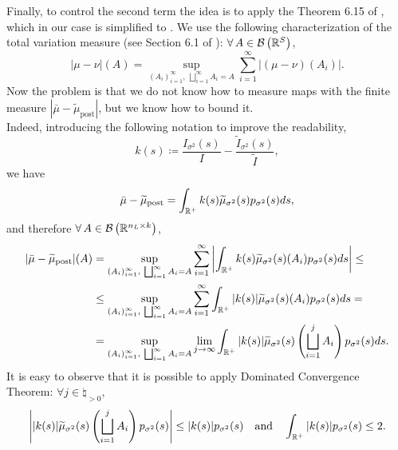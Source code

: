 Finally, to control the second term the idea is to apply the Theorem 6.15 of \citet{otvillani2008}, which in our case is simplified to . 
We use the following characterization of the total variation measure (see Section 6.1 of \citet{rcarudin1987}): $\forall A \in \borel{\real^S}$,
\begin{equation*}
	|\mu - \nu|(A) = \sup_{\left(A_i\right)_{i = 1}^{\infty}, \ \bigsqcup_{i = 1}^{\infty} A_i = A} \sum_{i = 1}^{\infty} |(\mu - \nu)(A_i)|.
\end{equation*}
Now the problem is that we do not know how to measure maps with the finite measure $|\bar{\mu} - \widetilde{\mu}_\mathrm{post}|$, but we know how to bound it. \\
Indeed, introducing the following notation to improve the readability,
\begin{equation*}
	k(s) \coloneqq \frac{\mathit{I}_{\sigma^2}(s)}{\mathit{I}} - \frac{\widetilde{\mathit{I}}_{\sigma^2}(s)}{\widetilde{\mathit{I}}},
\end{equation*}
we have
\begin{equation*}
	\bar{\mu} - \widetilde{\mu}_{\mathrm{post}} = \int_{\mathbb{R}^+} k(s) \widetilde{\mu}_{\sigma^2}(s) p_{\sigma^2}(s) ds,
\end{equation*}
and therefore $\forall A \in \borel{\real^{n_L \times k}}$, 
\begin{equation*}
	\begin{aligned}
		|\bar{\mu} - \widetilde{\mu}_\mathrm{post}|(A) & = \sup_{\left(A_i\right)_{i = 1}^{\infty}, \ \bigsqcup_{i = 1}^{\infty} A_i = A} \sum_{i = 1}^{\infty} \left|\int_{\real^+} k(s) \widetilde{\mu}_{\sigma^2}(s)(A_i) p_{\sigma^2}(s) ds\right| \leq \\
		& \leq \sup_{\left(A_i\right)_{i = 1}^{\infty}, \ \bigsqcup_{i = 1}^{\infty} A_i = A} \sum_{i = 1}^{\infty} \int_{\real^+} |k(s)| \widetilde{\mu}_{\sigma^2}(s)(A_i) p_{\sigma^2}(s) ds = \\
		& = \sup_{\left(A_i\right)_{i = 1}^{\infty}, \ \bigsqcup_{i = 1}^{\infty} A_i = A} \lim_{j \to \infty} \int_{\real^+} |k(s)| \widetilde{\mu}_{\sigma^2}(s)\left(\bigsqcup_{i = 1}^j A_i\right) p_{\sigma^2}(s) ds.
	\end{aligned}
\end{equation*}
It is easy to observe that it is possible to apply Dominated Convergence Theorem: $\forall j \in \natural_{> 0}$,
\begin{equation*}
	\left||k(s)| \widetilde{\mu}_{\sigma^2}(s)\left(\bigsqcup_{i = 1}^j A_i\right) p_{\sigma^2}(s)\right| \leq |k(s)| p_{\sigma^2}(s) \quad \text{and} \quad \int_{\mathbb{R}^+} |k(s)| p_{\sigma^2}(s) \leq 2.
\end{equation*}
